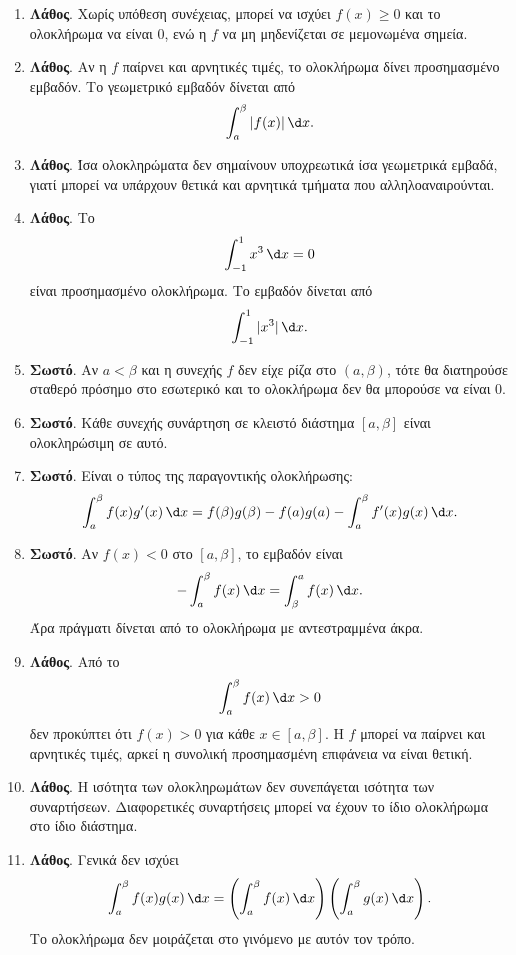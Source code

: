\begin{enumerate}[label=\textbf{3.\arabic*.}]
\item \textbf{Λάθος}. Χωρίς υπόθεση συνέχειας, μπορεί να ισχύει $f(x)\geq0$ και το ολοκλήρωμα να είναι $0$, ενώ η $f$ να μη μηδενίζεται σε μεμονωμένα σημεία.

\item \textbf{Λάθος}. Αν η $f$ παίρνει και αρνητικές τιμές, το ολοκλήρωμα δίνει προσημασμένο εμβαδόν. Το γεωμετρικό εμβαδόν δίνεται από
\[
\dint_a^\beta |f(x)|\,\d x.
\]

\item \textbf{Λάθος}. Ίσα ολοκληρώματα δεν σημαίνουν υποχρεωτικά ίσα γεωμετρικά εμβαδά, γιατί μπορεί να υπάρχουν θετικά και αρνητικά τμήματα που αλληλοαναιρούνται.

\item \textbf{Λάθος}. Το
\[
\dint_{-1}^{1}x^3\,\d x=0
\]
είναι προσημασμένο ολοκλήρωμα. Το εμβαδόν δίνεται από
\[
\dint_{-1}^{1}|x^3|\,\d x.
\]

\item \textbf{Σωστό}. Αν $a<\beta$ και η συνεχής $f$ δεν είχε ρίζα στο $(a,\beta)$, τότε θα διατηρούσε σταθερό πρόσημο στο εσωτερικό και το ολοκλήρωμα δεν θα μπορούσε να είναι $0$.

\item \textbf{Σωστό}. Κάθε συνεχής συνάρτηση σε κλειστό διάστημα $[a,\beta]$ είναι ολοκληρώσιμη σε αυτό.

\item \textbf{Σωστό}. Είναι ο τύπος της παραγοντικής ολοκλήρωσης:
\[
\dint_a^\beta f(x)g'(x)\,\d x
=f(\beta)g(\beta)-f(a)g(a)-\dint_a^\beta f'(x)g(x)\,\d x.
\]

\item \textbf{Σωστό}. Αν $f(x)<0$ στο $[a,\beta]$, το εμβαδόν είναι
\[
-\dint_a^\beta f(x)\,\d x
=
\dint_\beta^a f(x)\,\d x.
\]
Άρα πράγματι δίνεται από το ολοκλήρωμα με αντεστραμμένα άκρα.

\item \textbf{Λάθος}. Από το
\[
\dint_a^\beta f(x)\,\d x>0
\]
δεν προκύπτει ότι $f(x)>0$ για κάθε $x\in[a,\beta]$. Η $f$ μπορεί να παίρνει και αρνητικές τιμές, αρκεί η συνολική προσημασμένη επιφάνεια να είναι θετική.

\item \textbf{Λάθος}. Η ισότητα των ολοκληρωμάτων δεν συνεπάγεται ισότητα των συναρτήσεων. Διαφορετικές συναρτήσεις μπορεί να έχουν το ίδιο ολοκλήρωμα στο ίδιο διάστημα.

\item \textbf{Λάθος}. Γενικά δεν ισχύει
\[
\dint_a^\beta f(x)g(x)\,\d x
=
\left(\dint_a^\beta f(x)\,\d x\right)
\left(\dint_a^\beta g(x)\,\d x\right).
\]
Το ολοκλήρωμα δεν μοιράζεται στο γινόμενο με αυτόν τον τρόπο.


\end{enumerate}

